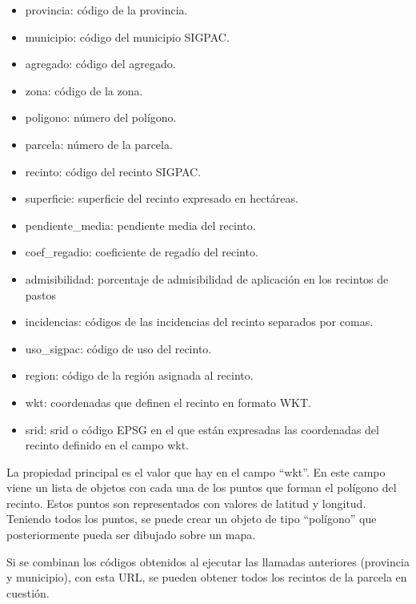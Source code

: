 \begin{itemize}
    \begin{itemize}
        \item provincia: código de la provincia.
        \item municipio: código del municipio SIGPAC.
        \item agregado: código del agregado.
        \item zona: código de la zona.
        \item poligono: número del polígono.
        \item parcela: número de la parcela.
        \item recinto: código del recinto SIGPAC.
        \item superficie: superficie del recinto expresado en hectáreas.
        \item pendiente\_media: pendiente media del recinto.
        \item coef\_regadio: coeficiente de regadío del recinto.
        \item admisibilidad: porcentaje de admisibilidad de aplicación en los recintos de pastos
        \item incidencias: códigos de las incidencias del recinto separados por comas.
        \item uso\_sigpac: código de uso del recinto.
        \item region: código de la región asignada al recinto.
        \item wkt: coordenadas que definen el recinto en formato WKT.
        \item srid: srid o código EPSG en el que están expresadas las coordenadas del recinto definido en el campo wkt.
    \end{itemize}

    La propiedad principal es el valor que hay en el campo ``wkt''. En este campo viene un lista de objetos con cada una
    de los puntos que forman el polígono del recinto. Estos puntos son representados con valores de latitud y longitud.
    Teniendo todos los puntos, se puede crear un objeto de tipo ``polígono'' que posteriormente pueda ser dibujado sobre
    un mapa.

    Si se combinan los códigos obtenidos al ejecutar las llamadas anteriores (provincia y municipio), con esta URL,
    se pueden obtener todos los recintos de la parcela en cuestión.
\end{itemize}






